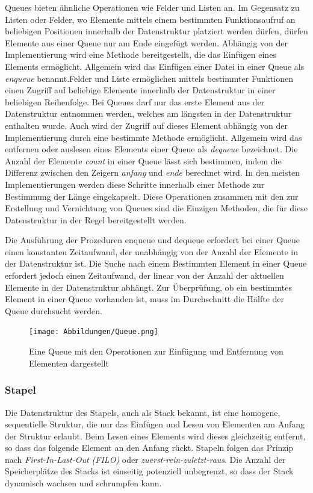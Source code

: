 Queues bieten ähnliche Operationen wie Felder und Listen an. Im Gegensatz zu Listen oder Felder, wo Elemente mittels einem bestimmten Funktionsaufruf an beliebigen Positionen innerhalb der Datenstruktur platziert werden dürfen, dürfen Elemente aus einer Queue nur am Ende eingefügt werden. Abhängig von der Implementierung wird eine Methode bereitgestellt, die das Einfügen eines Elements ermöglicht. Allgemein wird das Einfügen einer Datei in einer Queue als \textit{enqueue} benannt.Felder und Liste ermöglichen mittels bestimmter Funktionen einen Zugriff auf beliebige Elemente innerhalb der Datenstruktur in einer beliebigen Reihenfolge. Bei Queues darf nur das erste Element aus der Datenstruktur entnommen werden, welches am längsten in der Datenstruktur enthalten wurde. Auch wird der Zugriff auf dieses Element abhängig von der Implementierung durch eine bestimmte Methode ermöglicht. Allgemein wird das entfernen oder auslesen eines Elements einer Queue als \textit{dequeue} bezeichnet. Die Anzahl der Elemente \textit{count} in einer Queue lässt sich bestimmen, indem die Differenz zwischen den Zeigern \textit{anfang} und \textit{ende} berechnet wird. In den meisten Implementierungen werden diese Schritte innerhalb einer Methode zur Bestimmung der Länge eingekapselt. Diese Operationen zusammen mit den zur Erstellung und Vernichtung von Queues sind die Einzigen Methoden, die für diese Datenstruktur in der Regel bereitgestellt werden. \autocite[71-72]{hubwieser_fundamente_2015} \autocite[371]{gumm_band_2016}

Die Ausführung der Prozeduren enqueue und dequeue erfordert bei einer Queue einen konstanten Zeitaufwand, der unabhängig von der Anzahl der Elemente in der Datenstruktur ist. Die Suche nach einem Bestimmten Element in einer Queue erfordert jedoch einen Zeitaufwand, der linear von der Anzahl der aktuellen Elemente in der Datenstruktur abhängt. Zur Überprüfung, ob ein bestimmtes Element in einer Queue vorhanden ist, muss im Durchschnitt die Hälfte der Queue durchsucht werden. \autocite[318]{hoffmann_einfuhrung_2011}

\begin{figure}[t]
	\texttt{[image: Abbildungen/Queue.png]}
	\centering
	\caption[Queue]{Eine Queue mit den Operationen zur Einfügung und Entfernung von Elementen dargestellt \autocite[371]{gumm_band_2016}}
	\label{fig: queue}
\end{figure}

\subsubsection{Stapel}
Die Datenstruktur des Stapels, auch als Stack bekannt, ist eine homogene, sequentielle Struktur, die nur das Einfügen und Lesen von Elementen am Anfang der Struktur erlaubt. Beim Lesen eines Elements wird dieses gleichzeitig entfernt, so dass das folgende Element an den Anfang rückt. Stapeln folgen das Prinzip nach \textit{First-In-Last-Out (FILO)} oder \textit{zuerst-rein-zuletzt-raus}. Die Anzahl der Speicherplätze des Stacks ist einseitig potenziell unbegrenzt, so dass der Stack dynamisch wachsen und schrumpfen kann. \autocite[614]{ernst_grundkurs_2020}

